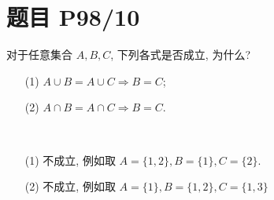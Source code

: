 \section*{题目 P98/10}

对于任意集合 $A,B,C$, 下列各式是否成立, 为什么?

\begin{itemize}
	\item[(1)] $A \cup B = A\cup C \Rightarrow B = C$;
	\item[(2)] $A \cap B = A \cap C \Rightarrow B = C$.
\end{itemize}

\begin{solution}\
	
	\begin{itemize}
		\item[(1)] 不成立, 例如取 $A=\{1,2\},B=\{1\},C=\{2\}$.
		\item[(2)] 不成立, 例如取 $A=\{1\},B=\{1,2\},C=\{1,3\}$
	\end{itemize}
\end{solution}

